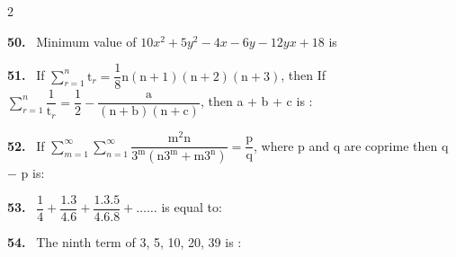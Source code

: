 \documentclass[10pt]{extarticle}
\newcommand{\qn}[1]{\par\smallskip\noindent\textbf{#1.}~}
\begin{document}
\begin{multicols}{2}
\qn{50} Minimum value of $10x^2+5y^2-4x-6y-12yx+18$ is
\qn{51} If $\displaystyle\sum_{r=1}^{n}\mathrm t_r=\dfrac18\mathrm n(\mathrm n+1)(\mathrm n+2)(\mathrm n+3)$, then If $\displaystyle\sum_{r=1}^{n}\dfrac1{\mathrm t_r}=\dfrac12-\dfrac{\mathrm a}{(\mathrm n+\mathrm b)(\mathrm n+\mathrm c)}$, then a + b + c is :
\qn{52} If $\displaystyle\sum_{m=1}^{\infty}\sum_{n=1}^{\infty}\dfrac{\mathrm m^2\mathrm n}{3^\mathrm m(\mathrm n3^\mathrm m+\mathrm m3^\mathrm n)}=\dfrac{\mathrm p}{\mathrm q}$, where p and q are coprime then q $-$ p is:
\qn{53} $\dfrac14+\dfrac{1.3}{4.6}+\dfrac{1.3.5}{4.6.8}+\dots\dots$ is equal to:
\qn{54} The ninth term of 3, 5, 10, 20, 39 is :
\end{multicols}
\end{document}

